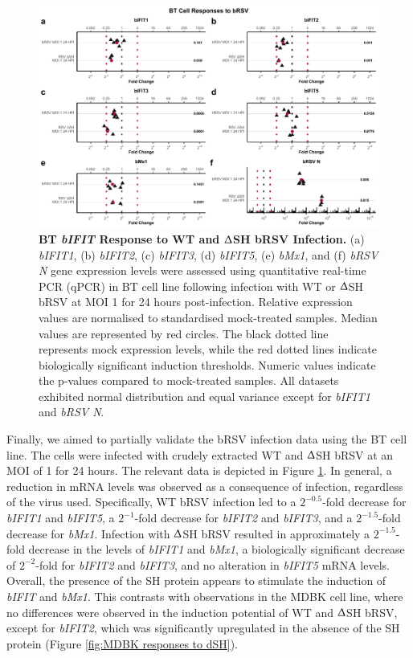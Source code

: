 \begin{figure}
    \centering
    \includegraphics[width=1\linewidth]{07. Chapter 2/Figs/02. Induction/09. bt_brsv.pdf}
    \caption[BT \textit{bIFIT} Response to WT and $\Updelta$SH bRSV Infection.]{\textbf{BT \textit{bIFIT} Response to WT and $\Updelta$SH bRSV Infection.} (a) \textit{bIFIT1}, (b) \textit{bIFIT2}, (c) \textit{bIFIT3}, (d) \textit{bIFIT5}, (e) \textit{bMx1}, and (f) \textit{bRSV N} gene expression levels were assessed using quantitative real-time PCR (qPCR) in BT cell line following infection with WT or $\Updelta$SH bRSV at MOI 1 for 24 hours post-infection. Relative expression values are normalised to standardised mock-treated samples. Median values are represented by red circles. The black dotted line represents mock expression levels, while the red dotted lines indicate biologically significant induction thresholds. Numeric values indicate the p-values compared to mock-treated samples. All datasets exhibited normal distribution and equal variance except for \textit{bIFIT1} and \textit{bRSV N}.}
    \label{fig:BT responses to bRSV}
\end{figure}

Finally, we aimed to partially validate the bRSV infection data using the BT cell line. The cells were infected with crudely extracted WT and $\Updelta$SH bRSV at an MOI of 1 for 24 hours. The relevant data is depicted in Figure \ref{fig:BT responses to bRSV}.  In general, a reduction in mRNA levels was observed as a consequence of infection, regardless of the virus used. Specifically, WT bRSV infection led to a \(2^{-0.5}\)-fold decrease for \textit{bIFIT1} and \textit{bIFIT5}, a \(2^{-1}\)-fold decrease for \textit{bIFIT2} and \textit{bIFIT3}, and a \(2^{-1.5}\)-fold decrease for \textit{bMx1}. Infection with $\Updelta$SH bRSV resulted in approximately a \(2^{-1.5}\)-fold decrease in the levels of \textit{bIFIT1} and \textit{bMx1}, a biologically significant decrease of \(2^{-2}\)-fold for \textit{bIFIT2} and \textit{bIFIT3}, and no alteration in \textit{bIFIT5} mRNA levels. Overall, the presence of the SH protein appears to stimulate the induction of \textit{bIFIT} and \textit{bMx1}. This contrasts with observations in the MDBK cell line, where no differences were observed in the induction potential of WT and $\Updelta$SH bRSV, except for \textit{bIFIT2}, which was significantly upregulated in the absence of the SH protein (Figure \ref{fig:MDBK responses to dSH}).

